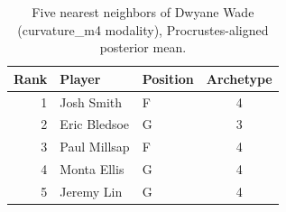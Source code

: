 \begin{table}[htbp]
  \centering\small
  \begin{tabular}{rllc}
    \toprule
    Rank & Player & Position & Archetype \\
    \midrule
    1 & Josh Smith & F & 4 \\
    2 & Eric Bledsoe & G & 3 \\
    3 & Paul Millsap & F & 4 \\
    4 & Monta Ellis & G & 4 \\
    5 & Jeremy Lin & G & 4 \\
    \bottomrule
  \end{tabular}
  \caption{Five nearest neighbors of Dwyane Wade (curvature_m4 modality), Procrustes-aligned posterior mean.}
  \label{tab:Dwyane_Wade_neighbors_curvature_m4}
\end{table}

